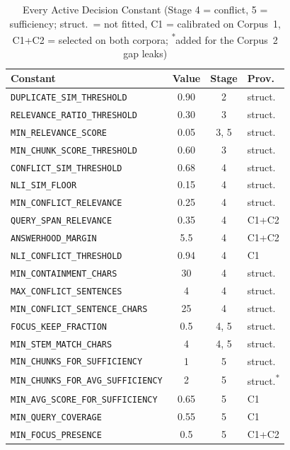 \documentclass[conference]{IEEEtran}
\begin{document}
\begin{table}[htbp]
\caption{Every Active Decision Constant (Stage 4 = conflict, 5 =
sufficiency; struct.\ = not fitted, C1 = calibrated on Corpus~1, C1+C2 =
selected on both corpora; \textsuperscript{*}added for the Corpus~2 gap
leaks)}
\label{tab:constants_full}
\centering
\scriptsize
\setlength{\tabcolsep}{3pt}
\begin{tabularx}{\columnwidth}{@{}X c c l@{}}
\toprule
Constant & Value & Stage & Prov. \\
\midrule
\texttt{DUPLICATE\_SIM\_THRESHOLD}        & 0.90 & 2    & struct. \\
\texttt{RELEVANCE\_RATIO\_THRESHOLD}      & 0.30 & 3    & struct. \\
\texttt{MIN\_RELEVANCE\_SCORE}            & 0.05 & 3, 5 & struct. \\
\texttt{MIN\_CHUNK\_SCORE\_THRESHOLD}     & 0.60 & 3    & struct. \\
\texttt{CONFLICT\_SIM\_THRESHOLD}         & 0.68 & 4    & struct. \\
\texttt{NLI\_SIM\_FLOOR}                  & 0.15 & 4    & struct. \\
\texttt{MIN\_CONFLICT\_RELEVANCE}         & 0.25 & 4    & struct. \\
\texttt{QUERY\_SPAN\_RELEVANCE}           & 0.35 & 4    & C1+C2 \\
\texttt{ANSWERHOOD\_MARGIN}               & 5.5  & 4    & C1+C2 \\
\texttt{NLI\_CONFLICT\_THRESHOLD}         & 0.94 & 4    & C1 \\
\texttt{MIN\_CONTAINMENT\_CHARS}          & 30   & 4    & struct. \\
\texttt{MAX\_CONFLICT\_SENTENCES}         & 4    & 4    & struct. \\
\texttt{MIN\_CONFLICT\_SENTENCE\_CHARS}   & 25   & 4    & struct. \\
\texttt{FOCUS\_KEEP\_FRACTION}            & 0.5  & 4, 5 & struct. \\
\texttt{MIN\_STEM\_MATCH\_CHARS}          & 4    & 4, 5 & struct. \\
\texttt{MIN\_CHUNKS\_FOR\_SUFFICIENCY}    & 1    & 5    & struct. \\
\texttt{MIN\_CHUNKS\_FOR\_AVG\_SUFFICIENCY} & 2  & 5    & struct.\textsuperscript{*} \\
\texttt{MIN\_AVG\_SCORE\_FOR\_SUFFICIENCY} & 0.65 & 5   & C1 \\
\texttt{MIN\_QUERY\_COVERAGE}             & 0.55 & 5    & C1 \\
\texttt{MIN\_FOCUS\_PRESENCE}             & 0.5  & 5    & C1+C2 \\
\bottomrule
\end{tabularx}
\end{table}




\balance
\end{document}
